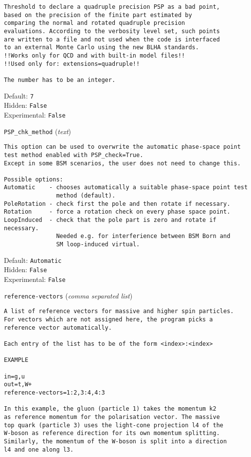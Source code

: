 \begin{basedescript}{\desclabelstyle{\pushlabel}}
\begin{verbatim}
Threshold to declare a quadruple precision PSP as a bad point,
based on the precision of the finite part estimated by
comparing the normal and rotated quadruple precision
evaluations. According to the verbosity level set, such points
are written to a file and not used when the code is interfaced
to an external Monte Carlo using the new BLHA standards.
!!Works only for QCD and with built-in model files!!
!!Used only for: extensions=quadruple!!

The number has to be an integer.
\end{verbatim}
Default: \verb|7|
\\Hidden: \verb|False|
\\Experimental: \verb|False|
\\\item[\colorbox{gray!30}{\texttt{PSP\_chk\_method}}] (\textit{text})
\begin{verbatim}
This option can be used to overwrite the automatic phase-space point
test method enabled with PSP_check=True.
Except in some BSM scenarios, the user does not need to change this.

Possible options:
Automatic    - chooses automatically a suitable phase-space point test
               method (default).
PoleRotation - check first the pole and then rotate if necessary.
Rotation     - force a rotation check on every phase space point.
LoopInduced  - check that the pole part is zero and rotate if necessary.
               Needed e.g. for interferience between BSM Born and
               SM loop-induced virtual.
\end{verbatim}
Default: \verb|Automatic|
\\Hidden: \verb|False|
\\Experimental: \verb|False|
\\\item[\colorbox{gray!30}{\texttt{reference-vectors}}] (\textit{comma separated list})
\begin{verbatim}
A list of reference vectors for massive and higher spin particles.
For vectors which are not assigned here, the program picks a
reference vector automatically.

Each entry of the list has to be of the form <index>:<index>

EXAMPLE

in=g,u
out=t,W+
reference-vectors=1:2,3:4,4:3

In this example, the gluon (particle 1) takes the momentum k2
as reference momentum for the polarisation vector. The massive
top quark (particle 3) uses the light-cone projection l4 of the
W-boson as reference direction for its own momentum splitting.
Similarly, the momentum of the W-boson is split into a direction
l4 and one along l3.


\end{verbatim}
\end{basedescript}
